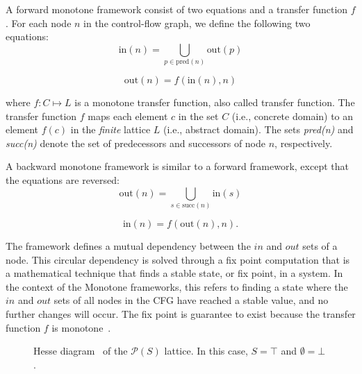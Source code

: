 A forward monotone framework consist of two equations and a transfer function $f$.
For each node $n$ in the control-flow graph, we define the following two equations:
$$\text{in}(n) = \bigcup\limits_{p \in \text{pred}(n)} \text{out}(p)$$

$$\text{out}(n) = f(\text{in}(n), n)$$

where $f:C \mapsto L$ is a monotone transfer function, also called transfer function.
The transfer function $f$ maps each element $c$ in the set $C$ (i.e., concrete domain)
to an element $f(c)$ in the \emph{finite} lattice $L$ (i.e., abstract domain). The sets \emph{pred(n)} and \emph{succ(n)}
denote the set of predecessors and successors of node $n$, respectively.

A backward monotone framework is similar to a forward framework, except that the equations are reversed:
$$\text{out}(n) = \bigcup\limits_{s \in \text{succ}(n)} \text{in}(s)$$

$$\text{in}(n) = f(\text{out}(n), n).$$

The framework defines a mutual dependency between the $in$ and $out$ sets of a node.
This circular dependency is solved through a fix point computation that is
a mathematical technique that finds a stable state, or fix point, in a system.
In the context of the Monotone frameworks, this
refers to finding a state where the $in$ and $out$ sets of all nodes in the CFG have reached a
stable value, and no further changes will occur. The fix point is guarantee to exist
because the transfer function $f$ is monotone~\cite{Knaster1929}.


\begin{figure}[h]
    \centering
{}
  \caption{\label{fig:lattice}Hesse diagram~\cite{Hesse1874} of the $\mathcal{P}(S)$ lattice.
  In this case, $S = \top$ and $\emptyset = \bot$.}
\end{figure}

